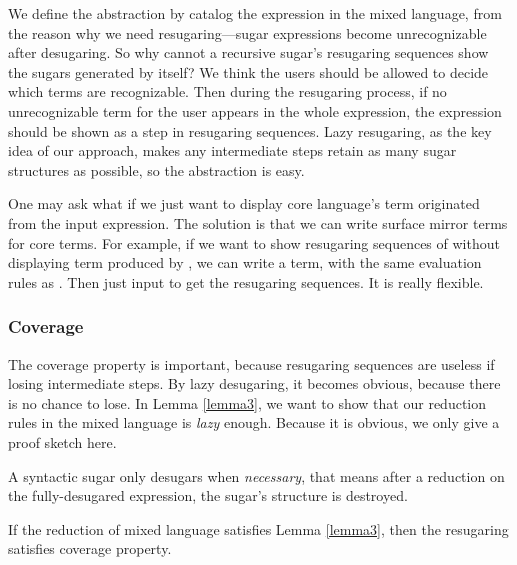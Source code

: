 We define the abstraction by catalog the expression in the mixed language, from the reason why we need resugaring---sugar expressions become unrecognizable after desugaring. So why cannot a recursive sugar's resugaring sequences show the sugars generated by itself? We think the users should be allowed to decide which terms are recognizable. Then during the resugaring process, if no unrecognizable term for the user appears in the whole expression, the expression should be shown as a step in resugaring sequences. Lazy resugaring, as the key idea of our approach, makes any intermediate steps retain as many sugar structures as possible, so the abstraction is easy. 

One may ask what if we just want to display core language's term originated from the input expression. The solution is that we can write surface mirror terms for core terms. For example, if we want to show resugaring sequences of  without displaying  term produced by , we can write a  term, with the same evaluation rules as . Then just input  to get the resugaring sequences. It is really flexible.

\subsubsection{Coverage}
The coverage property is important, because resugaring sequences are useless if losing intermediate steps. By lazy desugaring, it becomes obvious, because there is no chance to lose. In Lemma \ref{lemma3}, we want to show that our reduction rules in the mixed language is \emph{lazy} enough. Because it is obvious, we only give a proof sketch here.
\begin{lemma}
\label{lemma3}
A syntactic sugar only desugars when \emph{necessary}, that means after a reduction on the fully-desugared expression, the sugar's structure is destroyed.
\end{lemma}

\begin{Def}[Coverage]
If the reduction of mixed language satisfies Lemma \ref{lemma3}, then the resugaring satisfies coverage property.
\end{Def}



